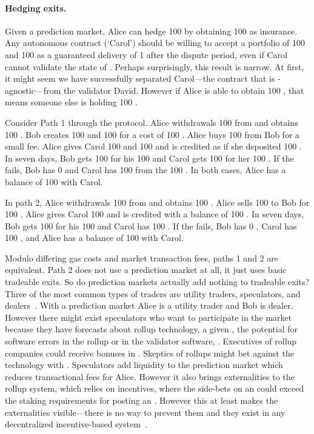 \paragraph{Hedging exits.} Given a prediction market, Alice can hedge 100 \ethxx by obtaining 100 \fail as insurance. Any autonomous \layerone contract (`Carol') should be willing to accept a portfolio of 100 \ethxx and 100 \fail as a guaranteed delivery of 1 \ethone after the dispute period, even if Carol cannot validate the state of \layertwo.  Perhaps surprisingly, this result is narrow. At first, it might seem we have successfully separated Carol---the \layerone contract that is \layertwo-agnostic---from the \layertwo validator David. However if Alice is able to obtain 100 \fail, that means someone else is holding 100 \final. 

Consider Path 1 through the protocol. Alice withdrawals 100 \ethtwo from \layertwo and obtains 100 \ethxx. Bob creates 100 \fail and 100 \final for a cost of 100 \ethone. Alice buys 100 \fail from Bob for a small fee. Alice gives Carol 100 \ethxx and 100 \fail and is credited as if she deposited 100 \ethone. In seven days, Bob gets 100 \ethone for his 100 \final and Carol gets 100 \ethone for her 100 \ethxx. If the \rblock fails, Bob has 0 \ethone and Carol has 100 \ethone from the 100 \fail. In both cases, Alice has a balance of 100 \ethone with Carol. 

In path 2, Alice withdrawals 100 \ethtwo from \layertwo and obtains 100 \ethxx. Alice sells 100 \ethxx to Bob for 100 \ethone. Alice gives Carol 100 \ethone and is credited with a balance of 100 \ethone. In seven days, Bob gets 100 \ethone for his 100 \ethxx and Carol has 100 \ethone. If the \rblock fails, Bob has 0 \ethone, Carol has 100 \ethone, and Alice has a balance of 100 \ethone with Carol.

Modulo differing gas costs and market transaction fees, paths 1 and 2 are equivalent. Path 2 does not use a prediction market at all, it just uses basic tradeable exits. So do prediction markets actually add nothing to tradeable exits? Three of the most common types of traders are utility traders, speculators, and dealers~\cite{Har03}. With a prediction market Alice is a utility trader and Bob is dealer. However there might exist speculators who want to participate in the market because they have forecasts about rollup technology, a given \rblock, the potential for software errors in the rollup or in the validator software, \etc. Executives of rollup companies could receive bonuses in \final. Skeptics of rollups might bet against the technology with \fail. Speculators add liquidity to the prediction market which reduces transactional fees for Alice. However it also brings externalities to the rollup system, which relies on incentives, where the side-bets on an \rblock could exceed the staking requirements for posting an \rblock. However this at least makes the externalities visible---there is no way to prevent them and they exist in any decentralized incentive-based system~\cite{FoBo19}. 

